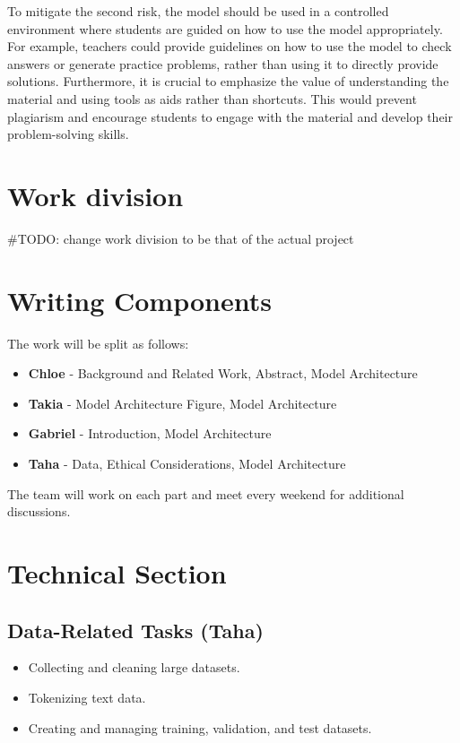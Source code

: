 \documentclass{article}
\begin{document}
To mitigate the second risk, the model should be used in a controlled environment where students are guided on how to use the model appropriately. For example, teachers could provide guidelines on how to use the model to check answers or generate practice problems, rather than using it to directly provide solutions. Furthermore, it is crucial to emphasize the value of understanding the material and using tools as aids rather than shortcuts. This would prevent plagiarism and encourage students to engage with the material and develop their problem-solving skills.

\section{Work division}
#TODO: change work division to be that of the actual project

\section*{Writing Components}
The work will be split as follows:
\begin{itemize}
  \item \textbf{Chloe} - Background and Related Work, Abstract, Model Architecture
  \item \textbf{Takia} - Model Architecture Figure, Model Architecture
  \item \textbf{Gabriel} - Introduction, Model Architecture
  \item \textbf{Taha} - Data, Ethical Considerations, Model Architecture
\end{itemize}

The team will work on each part and meet every weekend for additional discussions.

\section*{Technical Section}

\subsection*{Data-Related Tasks (Taha)}
\begin{itemize}
  \item Collecting and cleaning large datasets.
  \item Tokenizing text data.
  \item Creating and managing training, validation, and test datasets.
\end{itemize}
\end{document}
